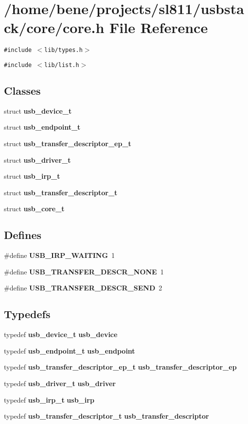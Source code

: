\section{/home/bene/projects/sl811/usbstack/core/core.h File Reference}
\label{core_8h}
{\tt \#include $<$lib/types.h$>$}\par
{\tt \#include $<$lib/list.h$>$}\par
\subsection*{Classes}
\begin{CompactItemize}
\item 
struct {\bf usb\_\-device\_\-t}
\item 
struct {\bf usb\_\-endpoint\_\-t}
\item 
struct {\bf usb\_\-transfer\_\-descriptor\_\-ep\_\-t}
\item 
struct {\bf usb\_\-driver\_\-t}
\item 
struct {\bf usb\_\-irp\_\-t}
\item 
struct {\bf usb\_\-transfer\_\-descriptor\_\-t}
\item 
struct {\bf usb\_\-core\_\-t}
\end{CompactItemize}
\subsection*{Defines}
\begin{CompactItemize}
\item 
\#define {\bf USB\_\-IRP\_\-WAITING}~1
\item 
\#define {\bf USB\_\-TRANSFER\_\-DESCR\_\-NONE}~1
\item 
\#define {\bf USB\_\-TRANSFER\_\-DESCR\_\-SEND}~2
\end{CompactItemize}
\subsection*{Typedefs}
\begin{CompactItemize}
\item 
typedef {\bf usb\_\-device\_\-t} {\bf usb\_\-device}
\item 
typedef {\bf usb\_\-endpoint\_\-t} {\bf usb\_\-endpoint}
\item 
typedef {\bf usb\_\-transfer\_\-descriptor\_\-ep\_\-t} {\bf usb\_\-transfer\_\-descriptor\_\-ep}
\item 
typedef {\bf usb\_\-driver\_\-t} {\bf usb\_\-driver}
\item 
typedef {\bf usb\_\-irp\_\-t} {\bf usb\_\-irp}
\item 
typedef {\bf usb\_\-transfer\_\-descriptor\_\-t} {\bf usb\_\-transfer\_\-descriptor}
\end{CompactItemize}
